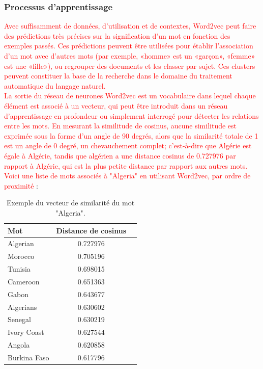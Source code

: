     \subsubsection{Processus d'apprentissage}
    
     \textcolor{red}{Avec suffisamment de données, d'utilisation et de contextes, Word2vec peut faire des prédictions très précises sur la signification d'un mot en fonction des exemples passés. Ces prédictions peuvent être utilisées pour établir l'association d'un mot avec d'autres mots (par exemple, «homme» est un «garçon», «femme» est une «fille»), ou regrouper des documents et les classer par sujet. Ces clusters peuvent constituer la base de la recherche dans le domaine du traitement automatique du langage naturel.\\ 
    La sortie du réseau de neurones Word2vec est un vocabulaire dans lequel chaque élément est associé à un vecteur, qui peut être introduit dans un réseau d'apprentissage en profondeur ou simplement interrogé pour détecter les relations entre les mots. En mesurant la similitude de cosinus, aucune similitude est exprimée sous la forme d'un angle de 90 degrés, alors que la similarité totale de 1 est un angle de 0 degré, un chevauchement complet; c'est-à-dire que Algérie est égale à Algérie, tandis que algérien a une distance cosinus de 0.727976 par rapport à Algérie, qui est la plus petite distance par rapport aux autres mots. Voici une liste de mots associés à "Algeria" en utilisant Word2vec, par ordre de proximité }:
    
    \begin{table}[h!]
        \centering
                 \begin{tabular}{|l|c|r|}
                    \hline
                    Mot & Distance de cosinus\\
                    \hline
                    Algerian & 0.727976 \\
                    Morocco & 0.705196 \\
                    Tunisia & 0.698015 \\
                    Cameroon & 0.651363 \\
                    Gabon & 0.643677 \\ 
                    Algerians & 0.630602 \\
                    Senegal & 0.630219 \\
                    Ivory Coast & 0.627544 \\
                    Angola & 0.620858 \\
                    Burkina Faso & 0.617796 \\
                    \hline
                 \end{tabular}
             \caption{Exemple du vecteur de similarité du mot "Algeria".}
             \label{table:1}
         \end{table}
             
